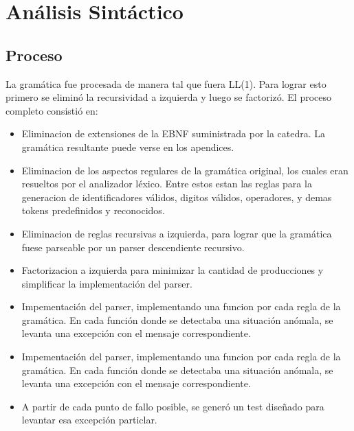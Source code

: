 \section{Análisis Sintáctico}

\hypertarget{_proceso}{}
\subsection{Proceso}
\label{_proceso}
La gramática fue procesada de manera tal que fuera LL(1). Para lograr
esto primero se eliminó la recursividad a izquierda y luego se
factorizó.
El proceso completo consistió en:
\begin{itemize}
 \item Eliminacion de extensiones de la EBNF suministrada por la catedra.
  La gramática resultante puede verse en los apendices.
 \item Eliminacion de los aspectos regulares de la gramática original, los cuales
  eran resueltos por el analizador léxico.
  Entre estos estan las reglas para la generacion de identificadores válidos,
  digitos válidos, operadores, y demas tokens predefinidos y reconocidos.
 \item Eliminacion de reglas recursivas a izquierda, para lograr que la gramática
  fuese parseable por un parser descendiente recursivo.
 \item Factorizacion a izquierda para minimizar la cantidad de producciones
  y simplificar la implementación del parser.
 \item Impementación del parser, implementando una funcion por cada regla de la
  gramática.
  En cada función donde se detectaba una situación anómala, se levanta una
  excepción con el mensaje correspondiente.
 \item Impementación del parser, implementando una funcion por cada regla de la
  gramática.
  En cada función donde se detectaba una situación anómala, se levanta una
  excepción con el mensaje correspondiente.
 \item A partir de cada punto de fallo posible, se generó un test diseñado para
  levantar esa excepción particlar.
\end{itemize}

